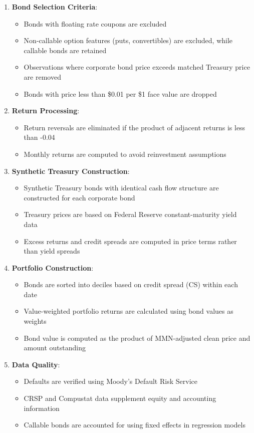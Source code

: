 \documentclass{article}
\begin{document}
\begin{enumerate}
    \item \textbf{Bond Selection Criteria}:
    \begin{itemize}
        \item Bonds with floating rate coupons are excluded
        \item Non-callable option features (puts, convertibles) are excluded, while callable bonds are retained
        \item Observations where corporate bond price exceeds matched Treasury price are removed
        \item Bonds with price less than \$0.01 per \$1 face value are dropped
    \end{itemize}

    \item \textbf{Return Processing}:
    \begin{itemize}
        \item Return reversals are eliminated if the product of adjacent returns is less than -0.04
        \item Monthly returns are computed to avoid reinvestment assumptions
    \end{itemize}

    \item \textbf{Synthetic Treasury Construction}:
    \begin{itemize}
        \item Synthetic Treasury bonds with identical cash flow structure are constructed for each corporate bond
        \item Treasury prices are based on Federal Reserve constant-maturity yield data
        \item Excess returns and credit spreads are computed in price terms rather than yield spreads
    \end{itemize}

    \item \textbf{Portfolio Construction}:
    \begin{itemize}
        \item Bonds are sorted into deciles based on credit spread (CS) within each date
        \item Value-weighted portfolio returns are calculated using bond values as weights
        \item Bond value is computed as the product of MMN-adjusted clean price and amount outstanding
    \end{itemize}

    \item \textbf{Data Quality}:
    \begin{itemize}
        \item Defaults are verified using Moody's Default Risk Service
        \item CRSP and Compustat data supplement equity and accounting information
        \item Callable bonds are accounted for using fixed effects in regression models
    \end{itemize}
\end{enumerate}
\end{document}
